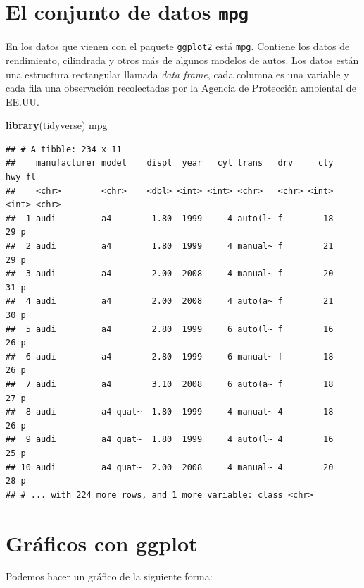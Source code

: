 \documentclass[]{book}
\newenvironment{Shaded}{\begin{snugshade}}{\end{snugshade}}
\newcommand{\KeywordTok}[1]{\textcolor[rgb]{0.13,0.29,0.53}{\textbf{#1}}}
\newcommand{\NormalTok}[1]{#1}
\theoremstyle{definition}
\theoremstyle{definition}
\theoremstyle{definition}
\theoremstyle{remark}
\begin{document}
\hypertarget{el-conjunto-de-datos-mpg}{%
\section{\texorpdfstring{El conjunto de datos
\texttt{mpg}}{El conjunto de datos mpg}}\label{el-conjunto-de-datos-mpg}}

En los datos que vienen con el paquete \texttt{ggplot2} está
\texttt{mpg}. Contiene los datos de rendimiento, cilindrada y otros más
de algunos modelos de autos. Los datos están una estructura rectangular
llamada \emph{data frame}, cada columna es una variable y cada fila una
observación recolectadas por la Agencia de Protección ambiental de
EE.UU.

\begin{Shaded}
\begin{Highlighting}[]
\KeywordTok{library}\NormalTok{(tidyverse)}
\NormalTok{mpg}
\end{Highlighting}
\end{Shaded}

\begin{verbatim}
## # A tibble: 234 x 11
##    manufacturer model    displ  year   cyl trans   drv     cty   hwy fl   
##    <chr>        <chr>    <dbl> <int> <int> <chr>   <chr> <int> <int> <chr>
##  1 audi         a4        1.80  1999     4 auto(l~ f        18    29 p    
##  2 audi         a4        1.80  1999     4 manual~ f        21    29 p    
##  3 audi         a4        2.00  2008     4 manual~ f        20    31 p    
##  4 audi         a4        2.00  2008     4 auto(a~ f        21    30 p    
##  5 audi         a4        2.80  1999     6 auto(l~ f        16    26 p    
##  6 audi         a4        2.80  1999     6 manual~ f        18    26 p    
##  7 audi         a4        3.10  2008     6 auto(a~ f        18    27 p    
##  8 audi         a4 quat~  1.80  1999     4 manual~ 4        18    26 p    
##  9 audi         a4 quat~  1.80  1999     4 auto(l~ 4        16    25 p    
## 10 audi         a4 quat~  2.00  2008     4 manual~ 4        20    28 p    
## # ... with 224 more rows, and 1 more variable: class <chr>
\end{verbatim}

\hypertarget{graficos-con-ggplot}{%
\section{Gráficos con ggplot}\label{graficos-con-ggplot}}

Podemos hacer un gráfico de la siguiente forma:
\end{document}
